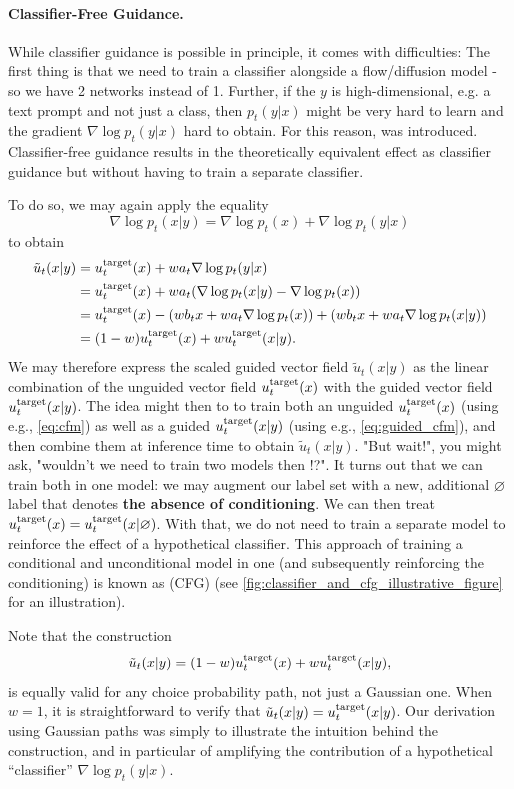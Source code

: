 \paragraph{Classifier-Free Guidance.} While classifier guidance is possible in principle, it comes with difficulties: The first thing is that we need to train a classifier alongside a flow/diffusion model - so we have 2 networks instead of 1. Further, if the $y$ is high-dimensional, e.g. a text prompt and not just a class, then $p_t(y|x)$ might be very hard to learn and the gradient $\nabla\log p_t(y|x)$ hard to obtain. For this reason,  \citep{cfg} was introduced. Classifier-free guidance results in the theoretically equivalent effect as classifier guidance but without having to train a separate classifier.

To do so, we may again apply the equality $$\nabla \log p_t(x|y) = \nabla \log p_t(x) + \nabla \log p_t(y|x)$$ to obtain 
\begin{align*}\tilde{u}_t(x|y) &= u^{\text{target}}_t(x) + w a_t \nabla \log p_t(y|x)\\
&= u^{\text{target}}_t(x) + w a_t (\nabla \log p_t(x|y) - \nabla \log p_t(x))\\
&= u^{\text{target}}_t(x) - (w b_tx + w a_t \nabla \log p_t(x)) + (w b_t x + w a_t \nabla \log p_t(x|y))\\
&= (1-w) u^{\text{target}}_t(x) + w u^{\text{target}}_t(x|y).\end{align*}
We may therefore express the scaled guided vector field $\tilde{u}_t(x|y)$ as the linear combination of the unguided vector field $u^{\text{target}}_t(x)$ with the guided vector field $u^{\text{target}}_t(x|y)$. The idea might then to to train both an unguided $u^{\text{target}}_t(x)$ (using e.g., \cref{eq:cfm}) as well as a guided $u^{\text{target}}_t(x|y)$ (using e.g., \cref{eq:guided_cfm}), and then combine them at inference time to obtain $\tilde{u}_t(x|y)$. "But wait!", you might ask, "wouldn't we need to train two models then !?". It turns out that we can train both in one model: we may augment our label set with a new, additional $\varnothing$ label that denotes \textbf{the absence of conditioning}. We can then treat $u^{\text{target}}_t(x)=u^{\text{target}}_t(x|\varnothing)$. With that, we do not need to train a separate model to reinforce the effect of a hypothetical classifier. This approach of training a conditional and unconditional model in one (and subsequently reinforcing the conditioning) is known as  (CFG) \cite{cfg} (see \cref{fig:classifier_and_cfg_illustrative_figure} for an illustration). 

\begin{remarkbox}
Note that the construction
\begin{equation*}
    \tilde{u}_t(x|y) = (1-w) u^{\text{target}}_t(x) + w u^{\text{target}}_t(x|y),
\end{equation*}
is equally valid for any choice probability path, not just a Gaussian one. When $w=1$, it is straightforward to verify that $\tilde{u}_t(x|y)=u^{\text{target}}_t(x|y)$. Our derivation using Gaussian paths was simply to illustrate the intuition behind the construction, and in particular of amplifying the contribution of a hypothetical ``classifier'' $\nabla \log p_t(y|x)$.
\end{remarkbox}

